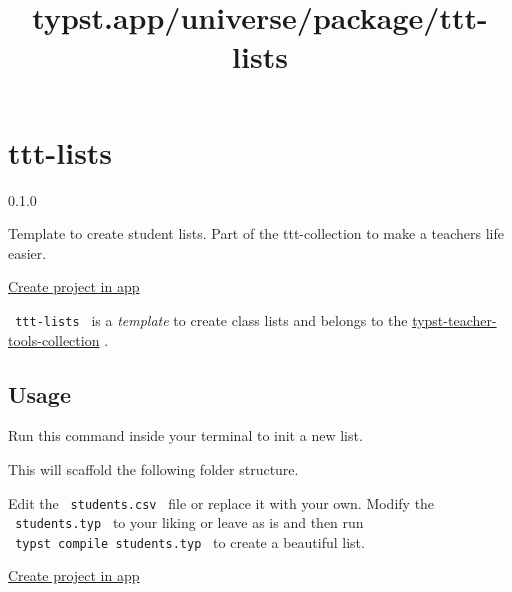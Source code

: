 \title{typst.app/universe/package/ttt-lists}

\label{banner}
\label{template-thumbnail}

\section{ttt-lists}\label{ttt-lists}

{ 0.1.0 }

Template to create student lists. Part of the ttt-collection to make a
teachers life easier.

\href{/app?template=ttt-lists&version=0.1.0}{Create project in app}

\label{readme}
\texttt{\ ttt-lists\ } is a \emph{template} to create class lists and
belongs to the
\href{https://github.com/jomaway/typst-teacher-templates}{typst-teacher-tools-collection}
.

\subsection{Usage}\label{usage}

Run this command inside your terminal to init a new list.

\begin{Shaded}
\begin{Highlighting}[]
\end{Highlighting}
\end{Shaded}

This will scaffold the following folder structure.

\begin{Shaded}
\begin{Highlighting}[]
\end{Highlighting}
\end{Shaded}

Edit the \texttt{\ students.csv\ } file or replace it with your own.
Modify the \texttt{\ students.typ\ } to your liking or leave as is and
then run \texttt{\ typst\ compile\ students.typ\ } to create a beautiful
list.

\href{/app?template=ttt-lists&version=0.1.0}{Create project in app}


